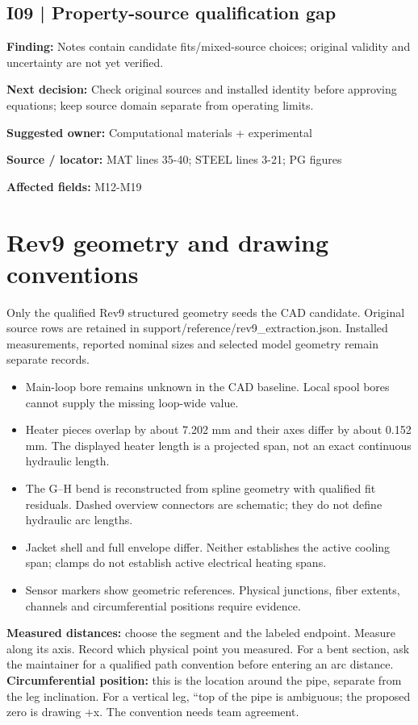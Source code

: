 \documentclass[11pt]{article}
\begin{document}
\par\noindent\begin{minipage}{\textwidth}\small\setlength{\parskip}{2pt}
\subsection*{I09 | Property-source qualification gap}
\textbf{Finding:} Notes contain candidate fits/mixed-source choices; original validity and uncertainty are not yet verified.\par
\textbf{Next decision:} Check original sources and installed identity before approving equations; keep source domain separate from operating limits.\par
\textbf{Suggested owner:} Computational materials + experimental\par
\textbf{Source / locator:} MAT lines 35-40; STEEL lines 3-21; PG figures\par
\textbf{Affected fields:} M12-M19\par
\end{minipage}\par\vspace{8pt}
\clearpage\section{Rev9 geometry and drawing conventions}\label{geometry-detail}
Only the qualified Rev9 structured geometry seeds the CAD candidate. Original source rows are retained in support/reference/rev9\_extraction.json. Installed measurements, reported nominal sizes and selected model geometry remain separate records.
\begin{itemize}
\item Main-loop bore remains unknown in the CAD baseline. Local spool bores cannot supply the missing loop-wide value.
\item Heater pieces overlap by about 7.202 mm and their axes differ by about 0.152 mm. The displayed heater length is a projected span, not an exact continuous hydraulic length.
\item The G--H bend is reconstructed from spline geometry with qualified fit residuals. Dashed overview connectors are schematic; they do not define hydraulic arc lengths.
\item Jacket shell and full envelope differ. Neither establishes the active cooling span; clamps do not establish active electrical heating spans.
\item Sensor markers show geometric references. Physical junctions, fiber extents, channels and circumferential positions require evidence.
\end{itemize}
\textbf{Measured distances:} choose the segment and the labeled endpoint. Measure along its axis. Record which physical point you measured. For a bent section, ask the maintainer for a qualified path convention before entering an arc distance.
\textbf{Circumferential position:} this is the location around the pipe, separate from the leg inclination. For a vertical leg, ``top of the pipe is ambiguous; the proposed zero is drawing +x. The convention needs team agreement.
\end{document}
